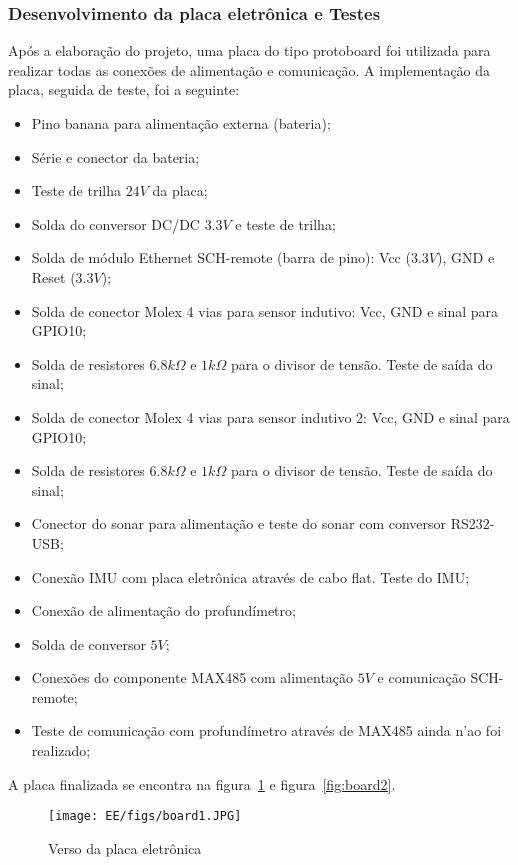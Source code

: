 \subsubsection{Desenvolvimento da placa eletrônica e Testes}
Após a elaboração do projeto, uma placa do tipo protoboard foi utilizada para
realizar todas as conexões de alimentação e comunicação. A implementação da
placa, seguida de teste, foi a seguinte:
\begin{itemize}
  \item Pino banana para alimentação externa (bateria);
  \item Série e conector da bateria;
  \item Teste de trilha $24V$ da placa;
  \item Solda do conversor DC/DC $3.3V$ e teste de trilha;
  \item Solda de módulo Ethernet SCH-remote (barra de pino): Vcc ($3.3V$), GND e
  Reset ($3.3V$);
  \item Solda de conector Molex 4 vias para sensor indutivo: Vcc, GND e sinal
  para GPIO10;
  \item Solda de resistores $6.8k\Omega$ e $1k\Omega$ para o divisor de tensão.
  Teste de saída do sinal;
  \item Solda de conector Molex 4 vias para sensor indutivo 2: Vcc, GND e sinal
  para GPIO10;
  \item Solda de resistores $6.8k\Omega$ e $1k\Omega$ para o divisor de tensão.
  Teste de saída do sinal;
  \item Conector do sonar para alimentação e teste do sonar com conversor
  RS232-USB;
  \item Conexão IMU com placa eletrônica através de cabo flat. Teste do IMU;
  \item Conexão de alimentação do profundímetro;
  \item Solda de conversor $5V$;
  \item Conexões do componente MAX485 com alimentação $5V$ e comunicação
  SCH-remote;
  \item Teste de comunicação com profundímetro através de MAX485 ainda n'ao foi
  realizado;
\end{itemize}

A placa finalizada se encontra na figura~\ref{fig:board1} e
figura~\ref{fig:board2}.


\begin{figure}[H]
 \centering
 \texttt{[image: EE/figs/board1.JPG]}
 \caption{Verso da placa eletrônica}
 \label{fig:board1}
 \end{figure}
 
